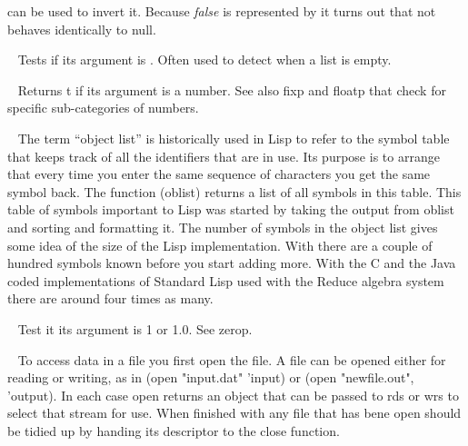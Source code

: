 \begin{description}
can be used to invert it. Because {\em false} is represented by \nil{} it
turns out that {\tx not} behaves identically to {\tx null}.
\item[{\tx null~~~~~~~~~} \hspace{1cm} {\em function 1 arg}]~\newline
Tests if its argument is \nil. Often used to detect when a list is empty.
\item[{\tx numberp~~~~~~} \hspace{1cm} {\em function 1 arg}]~\newline
Returns {\tx t} if its argument is a number. See also {\tx fixp} and
{\tx floatp} that check for specific sub-categories of numbers.
\item[{\tx oblist~~~~~~~} \hspace{1cm} {\em function 0 args}]~\newline
The term ``object list'' is historically used in Lisp to refer to the
symbol table that keeps track of all the identifiers that are in use. Its
purpose is to arrange that every time you enter the same sequence of characters
you get the same symbol back. The function {\tx (oblist)} returns a list of
all symbols in this table. This table of symbols important to Lisp was
started by taking the output from {\tx oblist} and sorting and
formatting it. The number of symbols in the object list gives some idea
of the size of the Lisp implementation. With \vsl{} there are a couple of hundred
symbols known before you start adding more. With the C and the Java coded
implementations of Standard Lisp used with the Reduce algebra system there are
around four times as many.
\item[{\tx onep~~~~~~~~~} \hspace{1cm} {\em function 1 arg}]~\newline
Test it its argument is 1 or 1.0. See {\tx zerop}.
\item[{\tx open~~~~~~~~~} \hspace{1cm} {\em function 2 args}]~\newline
To access data in a file you first {\tx open} the file. A file can be
opened either for reading or writing, as in {\tx (open "input.dat" 'input)}
or {\tx (open "newfile.out", 'output)}. In each case {\tx open} returns
an object that can be passed to {\tx rds} or {\tx wrs} to select that stream
for use. When finished with any file that has bene open should be
tidied up by handing its descriptor to the {\tx close} function.

\end{description}
